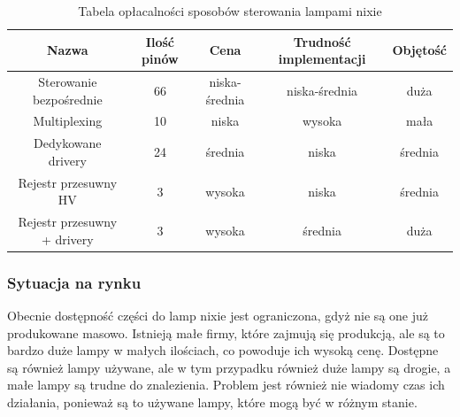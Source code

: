 \documentclass[../main.tex]{subfiles}
\begin{document}
\begin{table}[H]
  \centering
  \begin{tabular}{|c|c|c|c|c|}
    \hline
    Nazwa & Ilość pinów & Cena & Trudność implementacji & Objętość\\
    \hline
    Sterowanie bezpośrednie & 66 & niska-średnia & niska-średnia & duża \\
    \hline
    Multiplexing & 10 &niska & wysoka & mała \\
    \hline
    Dedykowane drivery & 24 &średnia & niska & średnia \\
    \hline
    Rejestr przesuwny HV & 3 &wysoka & niska & średnia \\
    \hline
    Rejestr przesuwny + drivery & 3 & wysoka & średnia & duża \\
    \hline
  \end{tabular}
  \caption{Tabela opłacalności sposobów sterowania lampami nixie}
\end{table}

\subsubsection{Sytuacja na rynku}
Obecnie dostępność części do lamp nixie jest ograniczona, gdyż nie są one już produkowane masowo. Istnieją małe firmy, które zajmują się produkcją, ale są to bardzo
duże lampy w małych ilościach, co powoduje ich wysoką cenę. Dostępne są również lampy używane, ale w tym przypadku również duże lampy są drogie, a małe lampy są trudne do znalezienia.
Problem jest również nie wiadomy czas ich działania, ponieważ są to używane lampy, które mogą być w różnym stanie.
\end{document}
